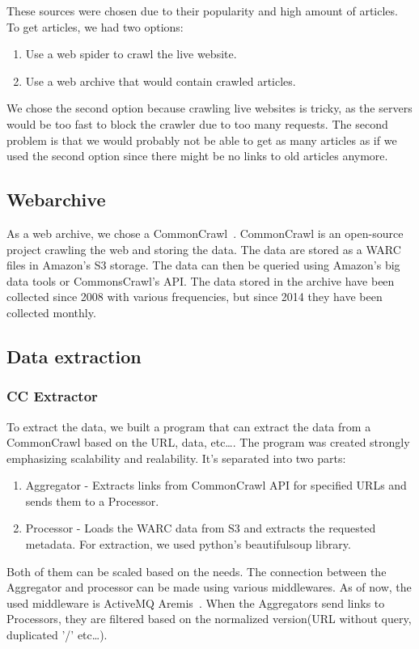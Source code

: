 These sources were chosen due to their popularity and high amount of articles.
To get articles, we had two options:
\begin{enumerate}
    \item Use a web spider to crawl the live website.
    \item Use a web archive that would contain crawled articles.
\end{enumerate}
We chose the second option because crawling live websites is tricky,
as the servers would be too fast to block the crawler due to too many requests.
The second problem is that we would probably not be able to get as many articles as
if we used the second option since there might be no links to old articles anymore.

\subsection{Webarchive}
As a web archive, we chose a CommonCrawl~\cite{CommonCrawl}. 
CommonCrawl is an open-source project crawling the web and storing the data. 
The data are stored as a WARC files in Amazon's S3 storage.
 The data can then be queried using Amazon's big data tools or CommonsCrawl's API.
The data stored in the archive have been collected since 2008 with various frequencies,
but since 2014 they have been collected monthly.

\subsection{Data extraction}
\subsubsection{CC Extractor}
To extract the data, we built a program that can extract the data from a CommonCrawl
 based on the URL, data, etc\dots. The program was 
created strongly emphasizing scalability and realability.
It's separated into two parts:
\begin{enumerate}
    \item Aggregator - 
    Extracts links from CommonCrawl API for specified URLs and sends them to a Processor.
    \item Processor - 
    Loads the WARC data from S3 and extracts the requested metadata.
    For extraction, we used python's beautifulsoup library.
\end{enumerate}
Both of them can be scaled based on the needs.
The connection between the Aggregator and processor can be made using various middlewares.
As of now, the used middleware is ActiveMQ Aremis~\cite{ActiveMQ}.
When the Aggregators send links to Processors,
they are filtered based on the normalized version(URL without query, duplicated '/' etc\dots).
